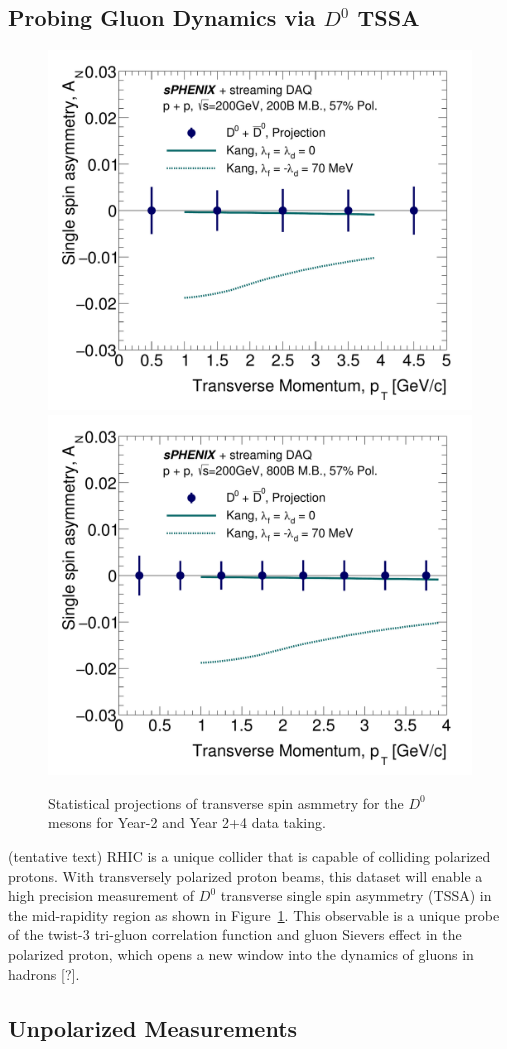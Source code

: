 \subsection{Probing Gluon Dynamics via $D^0$ TSSA}

\begin{figure}[htbp]
\begin{center}
\includegraphics[width=.49\linewidth]{figs/RAA_DB_theory_root_AN_D0D0bar_pp200B.pdf}
\includegraphics[width=.49\linewidth]{figs/RAA_DB_theory_root_AN_D0D0bar.pdf}
\caption{Statistical projections of transverse spin asmmetry for the $D^0$ mesons for Year-2 and Year 2+4 data taking.}
\label{fig:AN-D0}
\end{center}
\end{figure}

(tentative text) RHIC is a unique collider that is capable of colliding polarized protons. With transversely polarized proton beams, this dataset will enable a high precision measurement of $D^0$ transverse single spin asymmetry (TSSA) in the mid-rapidity region as shown in Figure~\ref{fig:AN-D0}. This observable is a unique probe of the twist-3 tri-gluon correlation function and gluon Sievers effect in the polarized proton, which opens a new window into the dynamics of gluons in hadrons [?]. 
 


\subsection {Unpolarized Measurements}

